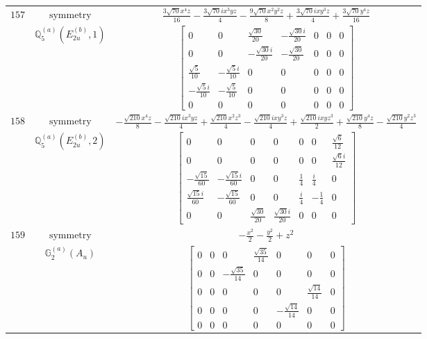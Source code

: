 \documentclass[fleqn,8pt,landscape]{jsarticle}
\begin{document}
\begin{longtable}{ccc}
$ 157 $ & $ \text{symmetry} $ & $ \frac{3 \sqrt{70} x^{4} z}{16} - \frac{3 \sqrt{70} i x^{3} y z}{4} - \frac{9 \sqrt{70} x^{2} y^{2} z}{8} + \frac{3 \sqrt{70} i x y^{3} z}{4} + \frac{3 \sqrt{70} y^{4} z}{16} $ \\
$  $ & $ \mathbb{Q}_{5}^{(a)}(E_{2u}^{(b)},1) $ & $ \begin{bmatrix} 0 & 0 & \frac{\sqrt{30}}{20} & - \frac{\sqrt{30} i}{20} & 0 & 0 & 0 \\ 0 & 0 & - \frac{\sqrt{30} i}{20} & - \frac{\sqrt{30}}{20} & 0 & 0 & 0 \\ \frac{\sqrt{5}}{10} & - \frac{\sqrt{5} i}{10} & 0 & 0 & 0 & 0 & 0 \\ - \frac{\sqrt{5} i}{10} & - \frac{\sqrt{5}}{10} & 0 & 0 & 0 & 0 & 0 \\ 0 & 0 & 0 & 0 & 0 & 0 & 0 \end{bmatrix} $ \\ \hline
$ 158 $ & $ \text{symmetry} $ & $ - \frac{\sqrt{210} x^{4} z}{8} - \frac{\sqrt{210} i x^{3} y z}{4} + \frac{\sqrt{210} x^{2} z^{3}}{4} - \frac{\sqrt{210} i x y^{3} z}{4} + \frac{\sqrt{210} i x y z^{3}}{2} + \frac{\sqrt{210} y^{4} z}{8} - \frac{\sqrt{210} y^{2} z^{3}}{4} $ \\
$  $ & $ \mathbb{Q}_{5}^{(a)}(E_{2u}^{(b)},2) $ & $ \begin{bmatrix} 0 & 0 & 0 & 0 & 0 & 0 & \frac{\sqrt{6}}{12} \\ 0 & 0 & 0 & 0 & 0 & 0 & \frac{\sqrt{6} i}{12} \\ - \frac{\sqrt{15}}{60} & - \frac{\sqrt{15} i}{60} & 0 & 0 & \frac{1}{4} & \frac{i}{4} & 0 \\ \frac{\sqrt{15} i}{60} & - \frac{\sqrt{15}}{60} & 0 & 0 & \frac{i}{4} & - \frac{1}{4} & 0 \\ 0 & 0 & \frac{\sqrt{30}}{20} & \frac{\sqrt{30} i}{20} & 0 & 0 & 0 \end{bmatrix} $ \\ \hline
$ 159 $ & $ \text{symmetry} $ & $ - \frac{x^{2}}{2} - \frac{y^{2}}{2} + z^{2} $ \\
$  $ & $ \mathbb{G}_{2}^{(a)}(A_{u}) $ & $ \begin{bmatrix} 0 & 0 & 0 & \frac{\sqrt{35}}{14} & 0 & 0 & 0 \\ 0 & 0 & - \frac{\sqrt{35}}{14} & 0 & 0 & 0 & 0 \\ 0 & 0 & 0 & 0 & 0 & \frac{\sqrt{14}}{14} & 0 \\ 0 & 0 & 0 & 0 & - \frac{\sqrt{14}}{14} & 0 & 0 \\ 0 & 0 & 0 & 0 & 0 & 0 & 0 \end{bmatrix} $ \\ \hline

\end{longtable}
\end{document}
